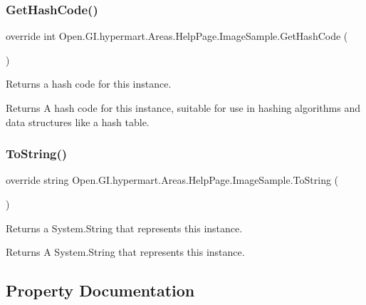 \subsubsection{\texorpdfstring{Get\+Hash\+Code()}{GetHashCode()}}
{\footnotesize\ttfamily override int Open.\+G\+I.\+hypermart.\+Areas.\+Help\+Page.\+Image\+Sample.\+Get\+Hash\+Code (\begin{DoxyParamCaption}{ }\end{DoxyParamCaption})}



Returns a hash code for this instance. 

\begin{DoxyReturn}{Returns}
A hash code for this instance, suitable for use in hashing algorithms and data structures like a hash table. 
\end{DoxyReturn}
\hypertarget{class_open_1_1_g_i_1_1hypermart_1_1_areas_1_1_help_page_1_1_image_sample_a704782de956313701ca9e6e61692d433}{}\label{class_open_1_1_g_i_1_1hypermart_1_1_areas_1_1_help_page_1_1_image_sample_a704782de956313701ca9e6e61692d433} 
\subsubsection{\texorpdfstring{To\+String()}{ToString()}}
{\footnotesize\ttfamily override string Open.\+G\+I.\+hypermart.\+Areas.\+Help\+Page.\+Image\+Sample.\+To\+String (\begin{DoxyParamCaption}{ }\end{DoxyParamCaption})}



Returns a System.\+String that represents this instance. 

\begin{DoxyReturn}{Returns}
A System.\+String that represents this instance. 
\end{DoxyReturn}


\subsection{Property Documentation}
\hypertarget{class_open_1_1_g_i_1_1hypermart_1_1_areas_1_1_help_page_1_1_image_sample_a19a1c712823d2e81590e2be51f2e30fb}{}\label{class_open_1_1_g_i_1_1hypermart_1_1_areas_1_1_help_page_1_1_image_sample_a19a1c712823d2e81590e2be51f2e30fb} 
